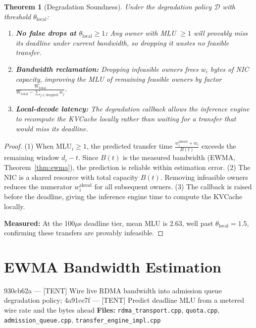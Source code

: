 \documentclass[11pt,a4paper,twoside]{article}
\theoremstyle{plain}
\newtheorem{theorem}{Theorem}[section]
\theoremstyle{definition}
\theoremstyle{remark}
\begin{document}
\begin{theorem}[Degradation Soundness]
\label{thm:degradation}
Under the degradation policy $\mathcal{D}$ with threshold $\theta_{\text{local}}$:
\begin{enumerate}[nosep]
  \item \textbf{No false drops at $\theta_{\text{local}} \geq 1$:}
    Any owner with MLU $\geq 1$ will provably miss its deadline under current
    bandwidth, so dropping it wastes no feasible transfer.
  \item \textbf{Bandwidth reclamation:}
    Dropping infeasible owners frees $w_i$ bytes of NIC capacity, improving
    the MLU of remaining feasible owners by factor
    $\frac{W_{\text{total}}}{W_{\text{total}} - \sum_{j \in \text{dropped}} w_j}$.
  \item \textbf{Local-decode latency:}
    The degradation callback allows the inference engine to recompute the KVCache
    locally rather than waiting for a transfer that would miss its deadline.
\end{enumerate}
\end{theorem}

\begin{proof}
(1) When $\text{MLU}_i \geq 1$, the predicted transfer time $\frac{w_i^{\text{ahead}} + w_i}{B(t)}$
exceeds the remaining window $d_i - t$. Since $B(t)$ is the measured bandwidth
(EWMA, Theorem~\ref{thm:ewma}), the prediction is reliable within estimation error.
(2) The NIC is a shared resource with total capacity $B(t)$. Removing infeasible owners
reduces the numerator $w_i^{\text{ahead}}$ for all subsequent owners.
(3) The callback is raised before the deadline, giving the inference engine time to
compute the KVCache locally.

\textbf{Measured:} At the 100$\mu$s deadline tier, mean MLU is 2.63, well past
$\theta_{\text{local}} = 1.5$, confirming these transfers are provably infeasible.
\end{proof}


\section{EWMA Bandwidth Estimation}
\label{sec:ewma}

\begin{commitbox}{930cb62a --- [TENT] Wire live RDMA bandwidth into admission queue
degradation policy; 4a91ce7f --- [TENT] Predict deadline MLU from a metered wire rate
and the bytes ahead}
\textbf{Files:} \texttt{rdma\_transport.cpp}, \texttt{quota.cpp},
\texttt{admission\_queue.cpp}, \texttt{transfer\_engine\_impl.cpp}
\end{commitbox}
\end{document}
